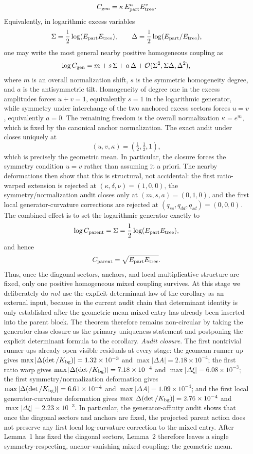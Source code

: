 \documentclass[aps,prd,onecolumn,notitlepage,nofootinbib,superscriptaddress,11pt,floatfix]{revtex4-2}
\begin{document}
\[
C_{\rm gen}=\kappa\,E_{\rm part}^uE_{\rm tree}^v.
\]
Equivalently, in logarithmic excess variables
\[
\Sigma=\frac12\log(E_{\rm part}E_{\rm tree}),
\qquad
\Delta=\frac12\log(E_{\rm part}/E_{\rm tree}),
\]
one may write the most general nearby positive homogeneous coupling as
\[
\log C_{\rm gen}
=
m+s\,\Sigma+a\,\Delta+\mathcal O(\Sigma^2,\Sigma\Delta,\Delta^2),
\]
where \(m\) is an overall normalization shift, \(s\) is the symmetric homogeneity degree, and \(a\) is the antisymmetric tilt. Homogeneity of degree one in the excess amplitudes forces \(u+v=1\), equivalently \(s=1\) in the logarithmic generator, while symmetry under interchange of the two anchored excess sectors forces \(u=v\), equivalently \(a=0\). The remaining freedom is the overall normalization \(\kappa=e^m\), which is fixed by the canonical anchor normalization. The exact audit under  closes uniquely at
\[
(u,v,\kappa)=\left(\tfrac12,\tfrac12,1\right),
\]
which is precisely the geometric mean. In particular, the closure forces the symmetry condition \(u=v\) rather than assuming it a priori. The nearby deformations then show that this is structural, not accidental: the first ratio-warped extension is rejected at \((\kappa,\delta,\nu)=(1,0,0)\), the symmetry/normalization audit closes only at \((m,s,a)=(0,1,0)\), and the first local generator-curvature corrections are rejected at \((q_{ss},q_{dd},q_{sd})=(0,0,0)\). The combined effect is to set the logarithmic generator exactly to
\[
\log C_{\rm parent}=\Sigma=\frac12\log(E_{\rm part}E_{\rm tree}),
\]
and hence
\[
C_{\rm parent}=\sqrt{E_{\rm part}E_{\rm tree}}.
\]
Thus, once the diagonal sectors, anchors, and local multiplicative structure are fixed, only one positive homogeneous mixed coupling survives. At this stage we deliberately do \emph{not} use the explicit determinant law of the corollary as an external input, because in the current audit chain that determinant identity is only established after the geometric-mean mixed entry has already been inserted into the parent block. The theorem therefore remains non-circular by taking the generator-class closure as the primary uniqueness statement and postponing the explicit determinant formula to the corollary.
\emph{Audit closure.}
The first nontrivial runner-ups already open visible residuals at every stage: the geomean runner-up gives \(\max|\Delta(\det/K_{\rm bg})|=1.32\times10^{-3}\) and \(\max|\Delta A|=2.18\times10^{-4}\); the first ratio warp gives \(\max|\Delta(\det/K_{\rm bg})|=7.18\times10^{-4}\) and \(\max|\Delta \xi|=6.08\times10^{-3}\); the first symmetry/normalization deformation gives \(\max|\Delta(\det/K_{\rm bg})|=6.61\times10^{-4}\) and \(\max|\Delta A|=1.09\times10^{-4}\); and the first local generator-curvature deformation gives \(\max|\Delta(\det/K_{\rm bg})|=2.76\times10^{-4}\) and \(\max|\Delta \xi|=2.23\times10^{-3}\). In particular, the generator-affinity audit shows that once the diagonal sectors and anchors are fixed, the projected parent action does not preserve any first local log-curvature correction to the mixed entry. After Lemma~1 has fixed the diagonal sectors, Lemma~2 therefore leaves a single symmetry-respecting, anchor-vanishing mixed coupling: the geometric mean.
\end{document}
